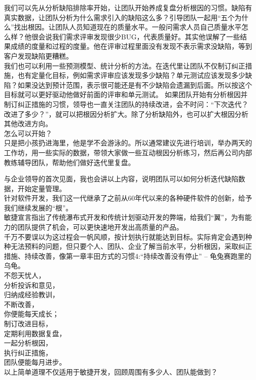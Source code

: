 {\begin{minipage}[t]{0.97\columnwidth}
我们可以先从分析缺陷排除率开始，让团队开始养成复盘分析根因的习惯。缺陷有真实数据，让团队分析为什么需求引入的缺陷这么多？引导团队一起用``五个为什么''找出根因。让团队人员知道现在的质量水平。一般问需求人员自己质量水平怎么样？他很会说我们需求评审发现很少BUG，代表质量好。其实他误解了一些结果成绩的度量和过程的度量。他在评审过程里面没有发现不表示需求没缺陷，等到客户发现缺陷更糟糕。\\
我们也可以利用一些预测模型、统计分析的方法。在迭代里让团队不仅制订纠正措施，也有定量化目标，例如需求评审应该发现多少缺陷？单元测试应该发现多少缺陷？如果没达到预计范围，表示很可能还是有不少缺陷会遗漏到后面。所以按这个目标就可以更好驱动他做好前面的评审和单元测试。
如果团队开始有分析根因并制订纠正措施的习惯，领导也一直关注团队的持续改进，会不时问：“下次迭代？改进了多少？”，就可以把根因分析扩大。除了分析缺陷外，也可以扩大根因分析其他改进方向。\\
怎么可以开始？\\
只是把小孩扔进海里，他是学不会游泳的。所以通常建议先进行培训，举办两天的工作坊，用一些实际的数据，带领大家做一些互动根因分析练习，然后再公司内部教练辅导团队，帮助他们做好迭代里复盘。\\
\strut
\end{minipage}}

与企业领导的首次见面，我也会讲以上内容，说明团队可以如何分析迭代缺陷数据，开始定量管理。\\
针对软件开发，我们这一代继承了之前从60年代以来的各种硬件软件的创新，给予我们继续发展的``根''。\\
敏捷宣言指出了传统瀑布式开发和传统计划驱动开发的弊端，给我们``翼''，为有能力的团队提供了机会，可以更快速地开发出高质量的产品。\\
千万不要误以为这过程会一帆风顺，按计划执行就能达到目标。实际肯定会遇到种种无法预料的问题，但只要个人、团队、企业了解当前水平，分析根因，采取纠正措施、持续改善，像第一章丰田方式的习惯4:“持续改善没有停止”  --  龟兔赛跑里的乌龟。\\
不怨天忧人，\\
分析投诉和意见，\\
归纳成经验教训，\\
不断改善，\\
你便能每天成长；\\
制订改进目标，\\
定期利用数据复盘，\\
一起分析根因，\\
执行纠正措施，\\
团队便能每月进步。\\
以上简单道理不仅适用于敏捷开发，回顾周围有多少人、团队能做到？\\

